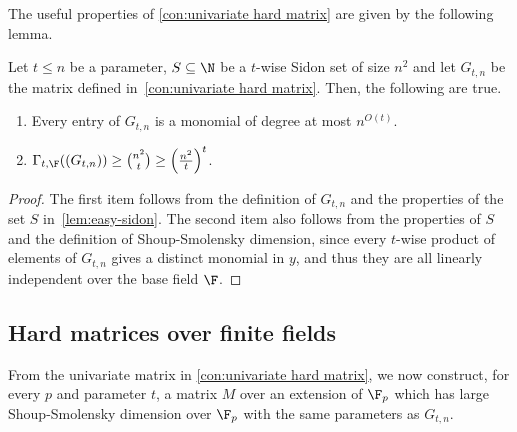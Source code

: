 The useful properties of \autoref{con:univariate hard matrix} are given by the following lemma.

\begin{lemma}
\label{lem:univariate hard properties}
Let $t \le n$ be a parameter, $S\subseteq\N$ be a $t$-wise Sidon set of size $n^2$ and let $G_{t,n}$ be the matrix defined in~\autoref{con:univariate hard matrix}. Then, the following are true. 
\begin{enumerate}
\item Every entry of $G_{t,n}$ is a monomial of degree at most $n^{O(t)}$. 
\item $\Gamma_{t,\F}((G_{t,n})) \geq \binom{n^2}{t} \ge  \left(\frac{n^2}{t}\right)^t$.
\end{enumerate}
\end{lemma}
\begin{proof}
The first item follows from the definition of $G_{t,n}$ and the properties of the set $S$ in~\autoref{lem:easy-sidon}. The second item also follows from the properties of $S$ and the definition of Shoup-Smolensky dimension, since every $t$-wise product of elements of $G_{t,n}$ gives a distinct monomial in $y$, and thus they are all linearly independent over the base field $\F$.
\end{proof}

\subsection{Hard matrices over finite fields}
From the univariate matrix in \autoref{con:univariate hard matrix}, we  now construct, for every $p$ and parameter $t$, a matrix $M$ over an extension of $\F_p$ which has large Shoup-Smolensky dimension over $\F_p$ with the same parameters as $G_{t,n}$.
 
